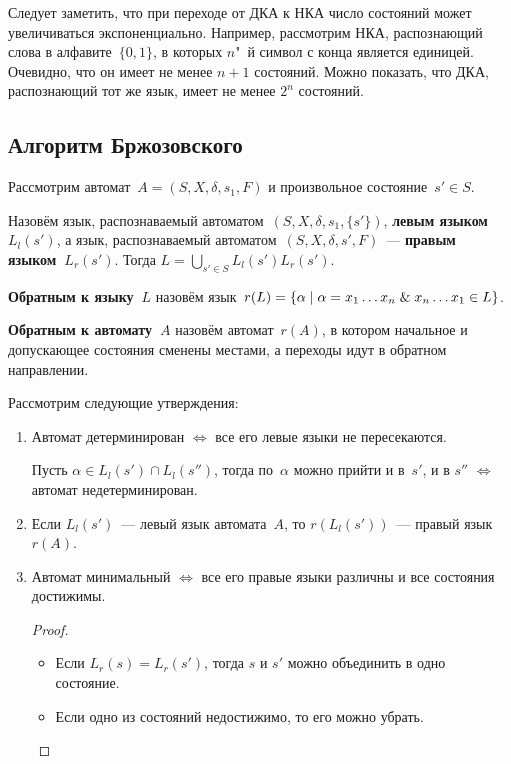 Следует заметить, что при переходе от ДКА к НКА число состояний может увеличиваться экспоненциально.
Например, рассмотрим НКА, распознающий слова в алфавите~$\{ 0, 1 \}$, в которых $n$"~й символ с конца является единицей.
Очевидно, что он имеет не менее $n + 1$ состояний.
Можно показать, что ДКА, распознающий тот же язык, имеет не менее $2^n$ состояний.

\subsection{Алгоритм Бржозовского}
Рассмотрим автомат~$A = (S, X, \delta, s_1, F)$ и произвольное состояние~$s' \in S$.

Назовём язык, распознаваемый автоматом~$(S, X, \delta, s_1, \{ s' \})$, \textbf{левым языком~$L_l(s')$}, а язык, распознаваемый автоматом~$(S, X, \delta, s', F)$~--- \textbf{правым языком~$L_r(s')$}.
Тогда $L = \bigcup\limits_{s' \in S} L_l(s') L_r(s')$.

\textbf{Обратным к языку~$L$} назовём язык~$r(L) = \{ \alpha \mid \alpha = x_1 \ldots x_n \mathrel{\&} x_n \ldots x_1 \in L \}$.

\textbf{Обратным к автомату~$A$} назовём автомат~$r(A)$, в котором начальное и допускающее состояния сменены местами, а переходы идут в обратном направлении.

Рассмотрим следующие утверждения:
\begin{enumerate}
	\item Автомат детерминирован $\Leftrightarrow$ все его левые языки не пересекаются.
	\begin{proofcontra}
	Пусть $\alpha \in L_l(s') \cap L_l(s'')$, тогда по~$\alpha$ можно прийти и в~$s'$, и в $s''$ $\Leftrightarrow$ автомат недетерминирован.
	\end{proofcontra}
	
	\item Если $L_l(s')$~--- левый язык автомата~$A$, то $r(L_l(s'))$~--- правый язык~$r(A)$.
	
	\item Автомат минимальный $\Leftrightarrow$ все его правые языки различны и все состояния достижимы.
	\begin{proof}
	\begin{itemize}
		\item Если $L_r(s) = L_r(s')$, тогда $s$ и $s'$ можно объединить в одно состояние.
		\item Если одно из состояний недостижимо, то его можно убрать.
	\end{itemize}
	\end{proof}
\end{enumerate}

